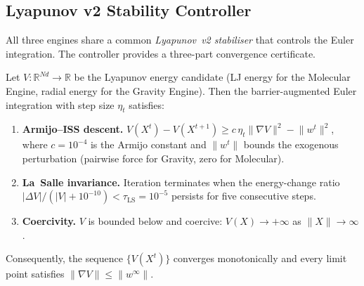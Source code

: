 \documentclass[final]{siamltex}
\newcommand{\R}{\mathbb{R}}
\newcommand{\norm}[1]{\lVert #1 \rVert}
\providecommand{\grad}{\nabla}
\begin{document}
\subsection{Lyapunov v2 Stability Controller}\label{sec:lyapv2}

All three engines share a common \emph{Lyapunov~v2 stabiliser}
that controls the Euler integration.  The controller provides a
three-part convergence certificate.

\begin{proposition}\label{prop:lyapv2}
Let $V:\R^{Nd}\to\R$ be the Lyapunov energy candidate
(LJ energy for the Molecular Engine, radial energy for the Gravity
Engine).  Then the barrier-augmented Euler integration with step
size $\eta_t$ satisfies:
\begin{enumerate}
\item[\textup{(i)}] \textbf{Armijo--ISS descent.}
  $V(X^t) - V(X^{t+1}) \ge c\,\eta_t\norm{\grad V}^2 - \norm{w^t}^2$,
  where $c = 10^{-4}$ is the Armijo constant and $\norm{w^t}$
  bounds the exogenous perturbation (pairwise force for Gravity,
  zero for Molecular).
\item[\textup{(ii)}] \textbf{La~Salle invariance.}  Iteration
  terminates when the energy-change ratio
  $|\Delta V|/(|V| + 10^{-10}) < \tau_{\mathrm{LS}} = 10^{-5}$
  persists for five consecutive steps.
\item[\textup{(iii)}] \textbf{Coercivity.}  $V$ is bounded below
  and coercive: $V(X)\to+\infty$ as $\norm{X}\to\infty$.
\end{enumerate}
Consequently, the sequence $\{V(X^t)\}$ converges monotonically
and every limit point satisfies $\norm{\grad V} \le
\norm{w^\infty}$.
\end{proposition}
\end{document}
